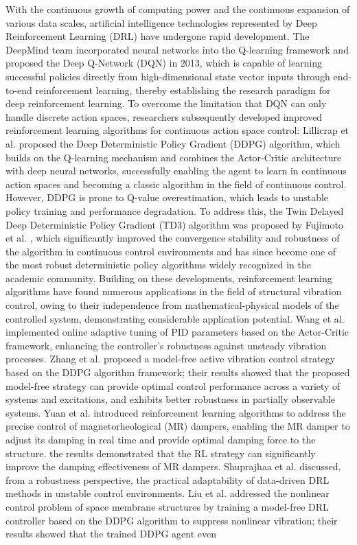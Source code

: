 \documentclass[review]{elsarticle}
\begin{document}
With the continuous growth of computing power and the continuous expansion of various data scales, artificial intelligence technologies represented by Deep Reinforcement Learning (DRL) have undergone rapid development. The DeepMind team \citep{mnih_playing_2013,mnih_human-level_2015} incorporated neural networks into the Q-learning framework and proposed the Deep Q-Network (DQN) in 2013, which is capable of learning successful policies directly from high-dimensional state vector inputs through end-to-end reinforcement learning, thereby establishing the research paradigm for deep reinforcement learning. To overcome the limitation that DQN can only handle discrete action spaces, researchers subsequently developed improved reinforcement learning algorithms for continuous action space control: Lillicrap et al. \citep{lillicrap_continuous_2015} proposed the Deep Deterministic Policy Gradient (DDPG) algorithm, which builds on the Q-learning mechanism and combines the Actor-Critic architecture with deep neural networks, successfully enabling the agent to learn in continuous action spaces and becoming a classic algorithm in the field of continuous control. However, DDPG is prone to Q-value overestimation, which leads to unstable policy training and performance degradation. To address this, the Twin Delayed Deep Deterministic Policy Gradient (TD3) algorithm was proposed by Fujimoto et al. \citep{fujimoto_addressing_2018}, which significantly improved the convergence stability and robustness of the algorithm in continuous control environments and has since become one of the most robust deterministic policy algorithms widely recognized in the academic community. Building on these developments, reinforcement learning algorithms have found numerous applications in the field of structural vibration control, owing to their independence from mathematical-physical models of the controlled system, demonstrating considerable application potential. Wang et al. \citep{wang_proposal_2007} implemented online adaptive tuning of PID parameters based on the Actor-Critic framework, enhancing the controller's robustness against unsteady vibration processes. Zhang et al. \citep{zhang_Novel_2023} proposed a model-free active vibration control strategy based on the DDPG algorithm framework; their results showed that the proposed model-free strategy can provide optimal control performance across a variety of systems and excitations, and exhibits better robustness in partially observable systems. Yuan et al. \citep{yuan_Research_2021} introduced reinforcement learning algorithms to address the precise control of magnetorheological (MR) dampers, enabling the MR damper to adjust its damping in real time and provide optimal damping force to the structure. the results demonstrated that the RL strategy can significantly improve the damping effectiveness of MR dampers. Shuprajhaa et al. \citep{shuprajhaa_reinforcement_2022} discussed, from a robustness perspective, the practical adaptability of data-driven DRL methods in unstable control environments. Liu et al. \citep{liu_active_2025} addressed the nonlinear control problem of space membrane structures by training a model-free DRL controller based on the DDPG algorithm to suppress nonlinear vibration; their results showed that the trained DDPG agent even 
\end{document}
